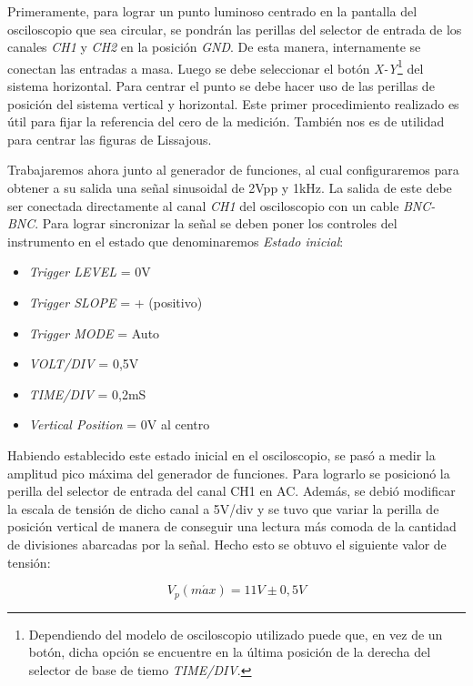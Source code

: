 \documentclass{article}
\begin{document}
	Primeramente, para lograr un punto luminoso centrado en la pantalla del osciloscopio que sea circular, se pondrán las perillas del selector de entrada de los canales \textit{CH1} y \textit{CH2} en la posición \textit{GND}. De esta manera, internamente se conectan las entradas a masa. Luego se debe seleccionar el botón \textit{X-Y}\footnote{Dependiendo del modelo de osciloscopio utilizado puede que, en vez de un botón, dicha opción se encuentre en la última posición de la derecha del selector de base de tiemo \textit{TIME/DIV}.} del sistema horizontal. Para centrar el punto se debe hacer uso de las perillas de posición del sistema vertical y horizontal.	Este primer procedimiento realizado es útil para fijar la referencia del cero de la medición. También nos es de utilidad para centrar las figuras de Lissajous.
	\par
	Trabajaremos ahora junto al generador de funciones, al cual configuraremos para obtener a su salida una señal sinusoidal de 2Vpp y 1kHz. La salida de este debe ser conectada directamente al canal \textit{CH1} del osciloscopio con un cable \textit{BNC-BNC}. Para lograr sincronizar la señal se deben poner los controles del instrumento en el estado que denominaremos \textit{Estado inicial}:
\medskip


\begin{itemize}
\itemsep=2pt \topsep=0pt \partopsep=0pt \parskip=0pt \parsep=0pt
	\item \textit{Trigger LEVEL} = 0V
	\item \textit{Trigger SLOPE} = + (positivo)
	\item \textit{Trigger MODE} = Auto
	\item \textit{VOLT/DIV} = 0,5V
	\item \textit{TIME/DIV} = 0,2mS
	\item \textit{Vertical Position} = 0V al centro
\end{itemize}
\bigskip


	Habiendo establecido este estado inicial en el osciloscopio, se pasó a medir la amplitud pico máxima del generador de funciones. Para lograrlo se posicionó la perilla del selector de entrada del canal CH1 en AC. Además, se debió modificar la escala de tensión de dicho canal a 5V/div y se tuvo que variar la perilla de posición vertical de manera de conseguir una lectura más comoda de la cantidad de divisiones abarcadas por la señal. Hecho esto se obtuvo el siguiente valor de tensión:

\begin{equation*}
	V_p(m\acute{a}x) = 11V \pm 0,5V
\end{equation*}
\medskip
	
\end{document}
